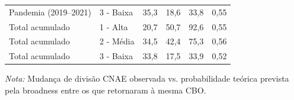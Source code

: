 {\begin{tabular}{llrrrr}
Pandemia (2019–2021) & 3 - Baixa & 35,3 & 18,6 & 33,8 & 0,55 \\
\addlinespace[3pt]
Total acumulado & 1 - Alta & 20,7 & 50,7 & 92,6 & 0,55 \\
Total acumulado & 2 - Média & 34,5 & 42,4 & 75,3 & 0,56 \\
Total acumulado & 3 - Baixa & 33,8 & 17,5 & 33,9 & 0,52 \\
\bottomrule
\end{tabular}
\vspace{2pt}
\par{\footnotesize \textit{Nota:} Mudança de divisão CNAE observada vs. probabilidade teórica prevista pela broadness entre os que retornaram à mesma CBO.}
}
